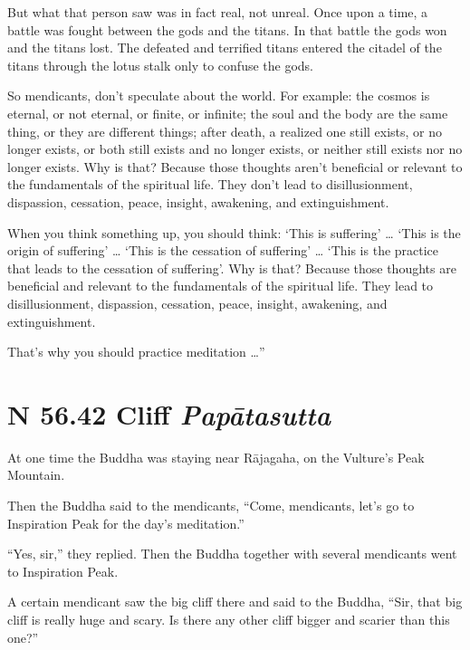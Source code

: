 \documentclass[12pt,openany]{book}%
\newcommand*{\suttatitleacronym}[1]{\smaller[2]{#1}\vspace*{.3em}}
\newcommand*{\suttatitletranslation}[1]{\linebreak{#1}}
\newcommand*{\suttatitleroot}[1]{\linebreak\smaller[2]\itshape{#1}}
\newcommand*{\tocacronym}[1]{\hspace*{-3.3em}{#1}\quad}
\newcommand*{\toctranslation}[1]{#1}
\newcommand*{\tocroot}[1]{(\textit{#1})}
\begin{document}
But what that person saw was in fact real, not unreal. Once upon a time, a battle was fought between the gods and the titans. In that battle the gods won and the titans lost. The defeated and terrified titans entered the citadel of the titans through the lotus stalk only to confuse the gods. 

So mendicants, don’t speculate about the world. For example: the cosmos is eternal, or not eternal, or finite, or infinite; the soul and the body are the same thing, or they are different things; after death, a realized one still exists, or no longer exists, or both still exists and no longer exists, or neither still exists nor no longer exists. Why is that? Because those thoughts aren’t beneficial or relevant to the fundamentals of the spiritual life. They don’t lead to disillusionment, dispassion, cessation, peace, insight, awakening, and extinguishment. 

When you think something up, you should think: ‘This is suffering’ … ‘This is the origin of suffering’ … ‘This is the cessation of suffering’ … ‘This is the practice that leads to the cessation of suffering’. Why is that? Because those thoughts are beneficial and relevant to the fundamentals of the spiritual life. They lead to disillusionment, dispassion, cessation, peace, insight, awakening, and extinguishment. 

That’s why you should practice meditation …” 

%
\section*{{\suttatitleacronym SN 56.42}{\suttatitletranslation A Cliff }{\suttatitleroot Papātasutta}}
\addcontentsline{toc}{section}{\tocacronym{SN 56.42} \toctranslation{A Cliff } \tocroot{Papātasutta}}

At one time the Buddha was staying near \textsanskrit{Rājagaha}, on the Vulture’s Peak Mountain. 

Then the Buddha said to the mendicants, “Come, mendicants, let’s go to Inspiration Peak for the day’s meditation.” 

“Yes, sir,” they replied. Then the Buddha together with several mendicants went to Inspiration Peak. 

A certain mendicant saw the big cliff there and said to the Buddha, “Sir, that big cliff is really huge and scary. Is there any other cliff bigger and scarier than this one?” 
\end{document}
